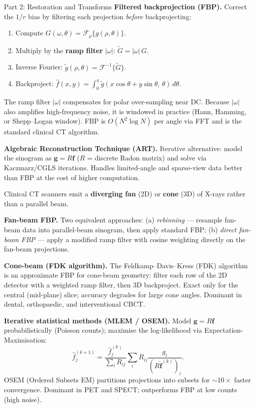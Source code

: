 \documentclass[letterpaper]{article}
\begin{document}
\begin{notes}{Part 2: Restoration and Transforms}
\textbf{Filtered backprojection (FBP).} Correct the $1/r$ bias by filtering each projection \emph{before} backprojecting:
\begin{enumerate}[noitemsep,topsep=0pt]
    \item Compute $G(\omega,\theta)=\mathcal{F}_\rho\{g(\rho,\theta)\}$.
    \item Multiply by the \textbf{ramp filter} $|\omega|$: $\tilde{G}=|\omega|\,G$.
    \item Inverse Fourier: $\tilde{g}(\rho,\theta)=\mathcal{F}^{-1}\{\tilde{G}\}$.
    \item Backproject: $\hat{f}(x,y)=\int_0^\pi \tilde{g}(x\cos\theta+y\sin\theta,\,\theta)\,d\theta$.
\end{enumerate}
The ramp filter $|\omega|$ compensates for polar over-sampling near DC. Because $|\omega|$ also amplifies high-frequency noise, it is windowed in practice (Hann, Hamming, or Shepp–Logan window). FBP is $O(N^2\log N)$ per angle via FFT and is the standard clinical CT algorithm.

\textbf{Algebraic Reconstruction Technique (ART).} Iterative alternative: model the sinogram as $\mathbf{g}=R\mathbf{f}$ ($R$ = discrete Radon matrix) and solve via Kaczmarz/CGLS iterations. Handles limited-angle and sparse-view data better than FBP at the cost of higher computation.


Clinical CT scanners emit a \textbf{diverging fan} (2D) or \textbf{cone} (3D) of X-rays rather than a parallel beam.

\textbf{Fan-beam FBP.} Two equivalent approaches: (a) \emph{rebinning} — resample fan-beam data into parallel-beam sinogram, then apply standard FBP; (b) \emph{direct fan-beam FBP} — apply a modified ramp filter with cosine weighting directly on the fan-beam projections.

\textbf{Cone-beam (FDK algorithm).} The Feldkamp--Davis--Kress (FDK) algorithm is an approximate FBP for cone-beam geometry: filter each row of the 2D detector with a weighted ramp filter, then 3D backproject. Exact only for the central (mid-plane) slice; accuracy degrades for large cone angles. Dominant in dental, orthopaedic, and interventional CBCT.

\textbf{Iterative statistical methods (MLEM / OSEM).} Model $\mathbf{g}=R\mathbf{f}$ probabilistically (Poisson counts); maximise the log-likelihood via Expectation-Maximisation:
$$\hat{f}_j^{(k+1)} = \frac{\hat{f}_j^{(k)}}{\sum_i R_{ij}}\sum_i R_{ij}\frac{g_i}{(R\hat{\mathbf{f}}^{(k)})_i}.$$
OSEM (Ordered Subsets EM) partitions projections into subsets for $\sim10\times$ faster convergence. Dominant in PET and SPECT; outperforms FBP at low counts (high noise).



\end{notes}
\end{document}
